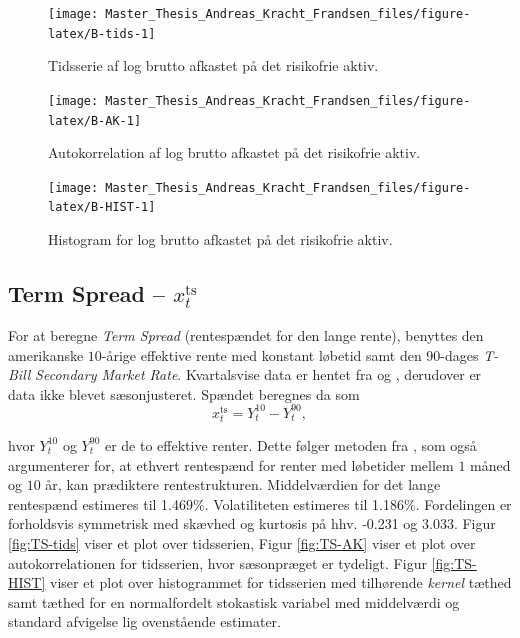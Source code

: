 \documentclass[
  a4paper,
  oneside]{memoir}
\begin{document}
\begin{figure}[H]

{\centering \texttt{[image: Master\_Thesis\_Andreas\_Kracht\_Frandsen\_files/figure-latex/B-tids-1]} 

}

\caption{Tidsserie af log brutto afkastet på det risikofrie aktiv.}\label{fig:B-tids}
\end{figure}

\begin{figure}[H]

{\centering \texttt{[image: Master\_Thesis\_Andreas\_Kracht\_Frandsen\_files/figure-latex/B-AK-1]} 

}

\caption{Autokorrelation af log brutto afkastet på det risikofrie aktiv.}\label{fig:B-AK}
\end{figure}

\begin{figure}[H]

{\centering \texttt{[image: Master\_Thesis\_Andreas\_Kracht\_Frandsen\_files/figure-latex/B-HIST-1]} 

}

\caption{Histogram for log brutto afkastet på det risikofrie aktiv.}\label{fig:B-HIST}
\end{figure}

\hypertarget{term-spread-x_ttextts}{%
\subsection{\texorpdfstring{Term Spread -- \(x_t^{\text{ts}}\)}{Term Spread -- x\_t\^{}\{\textbackslash text\{ts\}\}}}\label{term-spread-x_ttextts}}

For at beregne \emph{Term Spread} (rentespændet for den lange rente), benyttes den amerikanske \(10\)-årige effektive rente med konstant løbetid samt den 90-dages \emph{T-Bill} \emph{Secondary Market Rate}. Kvartalsvise data er hentet fra \citep{FRED102020} og \citep{FRED902020}, derudover er data ikke blevet sæsonjusteret. Spændet beregnes da som
\[x_t^{\text{ts}}=Y_t^{10}-Y_t^{90},\]

hvor \(Y_t^{10}\) og \(Y_t^{90}\) er de to effektive renter. Dette følger metoden fra \citep{Campbell1991}, som også argumenterer for, at ethvert rentespænd for renter med løbetider mellem \(1\) måned og \(10\) år, kan prædiktere rentestrukturen. Middelværdien for det lange rentespænd estimeres til 1.469\(\%\). Volatiliteten estimeres til 1.186\(\%\). Fordelingen er forholdsvis symmetrisk med skævhed og kurtosis på hhv. -0.231 og 3.033. Figur \ref{fig:TS-tids} viser et plot over tidsserien, Figur \ref{fig:TS-AK} viser et plot over autokorrelationen for tidsserien, hvor sæsonpræget er tydeligt. Figur \ref{fig:TS-HIST} viser et plot over histogrammet for tidsserien med tilhørende \emph{kernel} tæthed samt tæthed for en normalfordelt stokastisk variabel med middelværdi og standard afvigelse lig ovenstående estimater.
\end{document}
